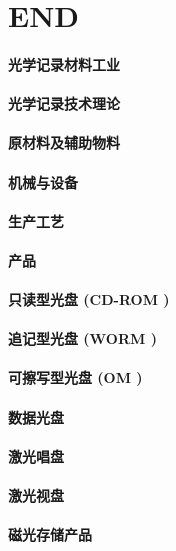 \documentclass[UTF8]{../../ApplicationUniverse}
\begin{document}
\chapter{END}
\subsubsection{光学记录材料工业}
\subsubsection{光学记录技术理论}
\subsubsection{原材料及辅助物料}
\subsubsection{机械与设备}
\subsubsection{生产工艺}
\subsubsection{产品}
    \subsubsection{只读型光盘 (CD-ROM )}
    \subsubsection{追记型光盘 (WORM )}
    \subsubsection{可擦写型光盘 (OM )}
    \subsubsection{数据光盘}
    \subsubsection{激光唱盘}
    \subsubsection{激光视盘}
        \subsubsection{磁光存储产品}
\end{document}
